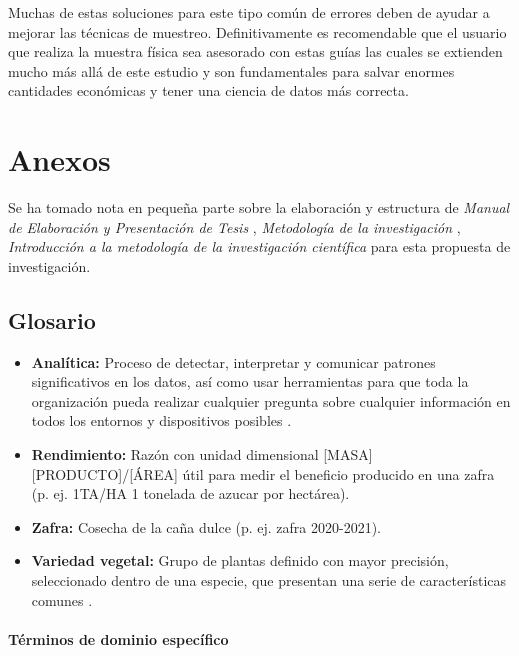 \documentclass{report}
\begin{document}
Muchas de estas soluciones para este tipo común de errores deben de ayudar a mejorar las técnicas de muestreo. Definitivamente es recomendable que el usuario que realiza la muestra física sea asesorado con estas guías las cuales se extienden mucho más allá de este estudio y son fundamentales para salvar enormes cantidades económicas y tener una ciencia de datos más correcta.

\chapter{Anexos}

Se ha tomado nota en pequeña parte sobre la elaboración y estructura de \textit{Manual de Elaboración y Presentación de Tesis} \cite{universidad-san-carlos-2016}, \textit{Metodología de la investigación} \cite{collado-2014}, \textit{Introducción a la metodología de la investigación científica} \cite{cabezas-2018} para esta propuesta de investigación.

\section{Glosario}

\begin{itemize}
    \item \textbf{Analítica:} Proceso de detectar, interpretar y comunicar patrones significativos en los datos, así como usar herramientas para que toda la organización pueda realizar cualquier pregunta sobre cualquier información en todos los entornos y dispositivos posibles \cite{oracle-2021}.
    
    \item \textbf{Rendimiento:} Razón con unidad dimensional [MASA][PRODUCTO]/[ÁREA] útil para medir el beneficio producido en una zafra (p. ej. 1TA/HA 1 tonelada de azucar por hectárea).
    
    \item \textbf{Zafra:} Cosecha de la caña dulce (p. ej. zafra 2020-2021).
    
    \item \textbf{Variedad vegetal:} Grupo de plantas definido con mayor precisión, seleccionado dentro de una especie, que presentan una serie de características comunes \cite{union-internacional-para-la-proteccion-de-las-obtenciones-vegatales-upov-2021}.
\end{itemize}

\subsubsection{Términos de dominio específico}
\end{document}
